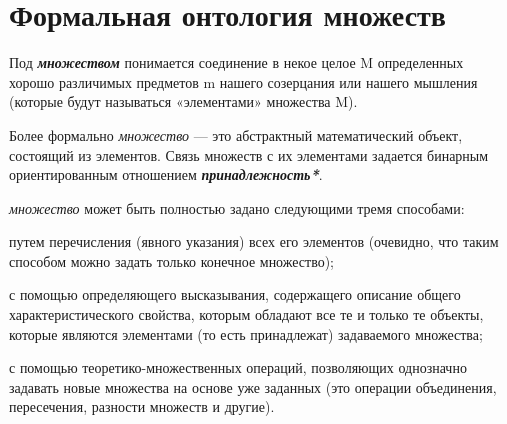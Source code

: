 \section{Формальная онтология множеств}
\label{sec_top_ontologies_set}

Под \textbf{\textit{множеством}} понимается соединение в некое целое M определенных хорошо различимых предметов m нашего созерцания или нашего мышления (которые будут называться «элементами» множества M). 

Более формально \textit{множество} --- это абстрактный математический объект, состоящий из элементов. Связь множеств с их элементами задается бинарным ориентированным отношением \textbf{\textit{принадлежность*}}.

\textit{множество} может быть полностью задано следующими тремя способами:

\begin{textitemize}
	\item путем перечисления (явного указания) всех его элементов (очевидно, что таким способом можно задать только конечное множество);
	\item с помощью определяющего высказывания, содержащего описание общего характеристического свойства, которым обладают все те и только те объекты, которые являются элементами (то есть принадлежат) задаваемого множества;
	\item с помощью теоретико-множественных операций, позволяющих однозначно задавать новые множества на основе уже заданных (это операции объединения, пересечения, разности множеств и другие).
\end{textitemize}

